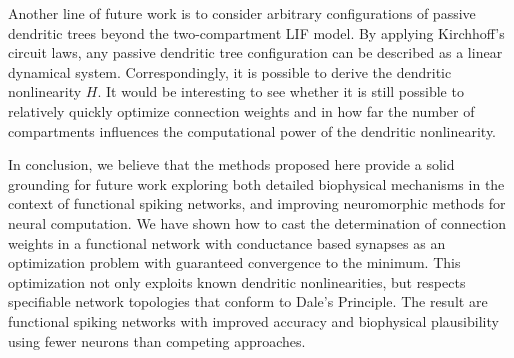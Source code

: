 Another line of future work is to consider arbitrary configurations of passive dendritic trees beyond the two-compartment LIF model. By applying Kirchhoff's circuit laws, any passive dendritic tree configuration can be described as a linear dynamical system. Correspondingly, it is possible to derive the dendritic nonlinearity $H$. It would be interesting to see whether it is still possible to relatively quickly optimize connection weights and in how far the number of compartments influences the computational power of the dendritic nonlinearity.

In conclusion, we believe that the methods proposed here provide a solid grounding for future work exploring both detailed biophysical mechanisms in the context of functional spiking networks, and improving neuromorphic methods for neural computation. We have shown how to cast the determination of connection weights in a functional network with conductance based synapses as an optimization problem with guaranteed convergence to the minimum. This optimization not only exploits known dendritic nonlinearities, but respects specifiable network topologies that conform to Dale's Principle. The result are functional spiking networks with improved accuracy and biophysical plausibility using fewer neurons than competing approaches.

